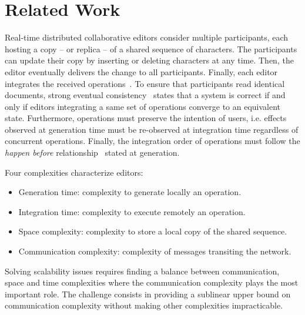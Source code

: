 \section{Related Work}
\label{sec:relatedwork}

Real-time distributed collaborative editors consider multiple participants, each
hosting a copy -- or replica -- of a shared sequence of characters. The
participants can update their copy by inserting or deleting characters at any
time. Then, the editor eventually delivers the change to all
participants. Finally, each editor integrates the received
operations~\cite{saito2005optimistic}. To ensure that participants read
identical documents, strong eventual consistency~\cite{bailis2013eventual,
  shapiro2011comprehensive, sun1998achieving} states that a system is correct if
and only if editors integrating a same set of operations converge to an
equivalent state. Furthermore, operations must preserve the intention of users,
i.e. effects observed at generation time must be re-observed at integration time
regardless of concurrent operations. Finally, the integration order of
operations must follow the \emph{happen before}
relationship~\cite{lamport1978time} stated at generation.

\noindent Four complexities characterize editors:
\begin{itemize}[noitemsep, leftmargin=*]
\item Generation time: complexity to generate locally an operation.
\item Integration time: complexity to execute remotely an operation.
\item Space complexity: complexity to store a local copy of the shared sequence.
\item Communication complexity: complexity of messages transiting the network.
\end{itemize}
Solving scalability issues requires finding a balance between communication,
space and time complexities %
where the communication complexity plays the most important role. The challenge
consists in providing a sublinear upper bound on communication complexity
without making other complexities impracticable.



